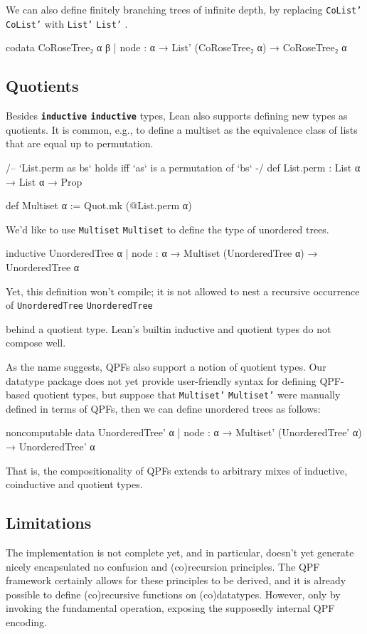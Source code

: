 \documentclass[titlepage]{report}
\newcommand\lean[1]{%
\ifx\leanmode\undefined%
\def\leanmode{1}%
\texttt{\small #1}%
\undef\leanmode%
\else%
\texttt{#1}%
\fi%
}
\newcommand\keyword[1]{{\color{keywordcolor} \textbf{\lean{#1}}}}
\newcommand\inductive{{\keyword{inductive}}}
\begin{document}
We can also define finitely branching trees of infinite depth, by replacing \lean{CoList'} with \lean{List'}.
\begin{leancode}
  codata CoRoseTree₂ α β
    | node : α → List' (CoRoseTree₂ α) → CoRoseTree₂ α
\end{leancode}


\subsection*{Quotients}
Besides \inductive{} types, Lean also supports defining new types as quotients.
It is common, e.g., to define a multiset as the equivalence class of lists that are equal up to permutation.

\begin{leancode}
  /-- `List.perm as bs` holds iff `as` is a permutation of `bs` -/
  def List.perm : List α → List α → Prop

  def Multiset α := Quot.mk (@List.perm α)
\end{leancode}

We'd like to use \lean{Multiset} to define the type of unordered trees. 

\begin{badleancode}
  inductive UnorderedTree α
    | node : α →  Multiset (UnorderedTree α) → UnorderedTree α
\end{badleancode}

Yet, this definition won't compile; it is not allowed to nest a recursive occurrence of \lean{UnorderedTree}
behind a quotient type. Lean's builtin inductive and quotient types do not compose well.


As the name suggests, QPFs also support a notion of quotient types. Our datatype package does not yet
provide user-friendly syntax for defining QPF-based quotient types, but suppose that \lean{Multiset'} were manually
defined in terms of QPFs, then we can define unordered trees as follows:
\begin{leancode}
  noncomputable data UnorderedTree' α
    | node : α →  Multiset' (UnorderedTree' α) → UnorderedTree' α
\end{leancode}

That is, the compositionality of QPFs extends to arbitrary mixes of inductive, coinductive and quotient types.




\subsection*{Limitations}
The implementation is not complete yet, and in particular, doesn't yet generate nicely encapsulated no confusion and (co)recursion principles.
The QPF framework certainly allows for these principles to be derived, and it is already possible to define (co)recursive functions on (co)datatypes.
However, only by invoking the fundamental operation, exposing the supposedly internal QPF encoding. 
\end{document}
